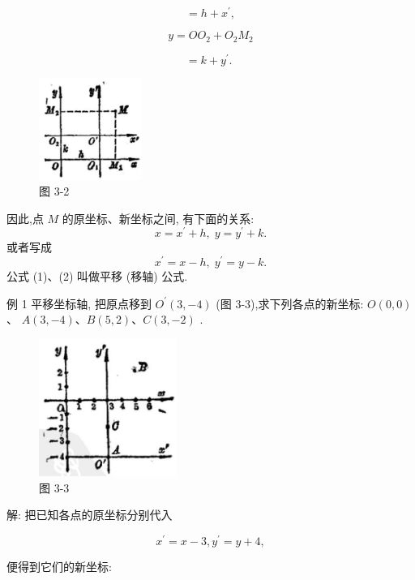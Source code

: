 \documentclass[lang=cn,newtx,12pt,scheme=chinese]{elegantbook}
\begin{document}
\[
  = h + {x}^{\prime },
\]

\[
  y = O{O}_{2} + {O}_{2}{M}_{2}
\]

\[
  = k + {y}^{\prime }\text{. }
\]

\begin{figure}[h]
  \centering
  \includegraphics[max width=0.3\textwidth]{images/01912cc2-ffb6-728e-9ae7-b113ff05c64b_134_803889.jpg}
  \caption{图 3-2}
\end{figure}

\begin{corollary}[平移 (移轴) 公式]
因此,点 \(M\) 的原坐标、新坐标之间, 有下面的关系:
\[
  x = {x}^{\prime } + h,\;y = {y}^{\prime } + k. \tag{1}
\]
或者写成
\[
    {x}^{\prime } = x - h,\;{y}^{\prime } = y - k. \tag{2}
\]
公式 (1)、(2) 叫做平移 (移轴) 公式.
\end{corollary}

例 1 平移坐标轴, 把原点移到 \({O}^{\prime }\left( {3, - 4}\right)\) (图 3-3),求下列各点的新坐标: \(O\left( {0,0}\right)\) 、 \(A\left( {3, - 4}\right) \text{、}B\left( {5,2}\right) \text{、}C\left( {3, - 2}\right)\) .

\begin{figure}[h]
  \centering
  \includegraphics[max width=0.4\textwidth]{images/01912cc2-ffb6-728e-9ae7-b113ff05c64b_134_527625.jpg}
  \caption{图 3-3}
\end{figure}

解: 把已知各点的原坐标分别代入

\[
    {x}^{\prime } = x - 3,{y}^{\prime } = y + 4,
\]

便得到它们的新坐标:
\end{document}
